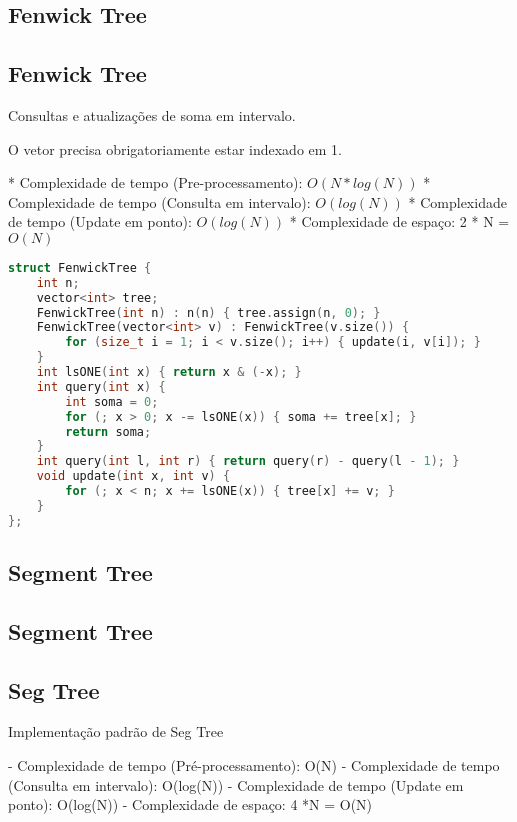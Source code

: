 \documentclass[11pt, a4paper, twoside]{article}
\begin{document}
\subsection{Fenwick Tree}


\subsection{Fenwick Tree}



Consultas e atualizações de soma em intervalo.

O vetor precisa obrigatoriamente estar indexado em 1.

* Complexidade de tempo (Pre-processamento): $O(N * log(N))$
* Complexidade de tempo (Consulta em intervalo): $O(log(N))$
* Complexidade de tempo (Update em ponto): $O(log(N))$
* Complexidade de espaço: 2 * N = $O(N)$

\begin{lstlisting}[language=C++]
struct FenwickTree {
    int n;
    vector<int> tree;
    FenwickTree(int n) : n(n) { tree.assign(n, 0); }
    FenwickTree(vector<int> v) : FenwickTree(v.size()) {
        for (size_t i = 1; i < v.size(); i++) { update(i, v[i]); }
    }
    int lsONE(int x) { return x & (-x); }
    int query(int x) {
        int soma = 0;
        for (; x > 0; x -= lsONE(x)) { soma += tree[x]; }
        return soma;
    }
    int query(int l, int r) { return query(r) - query(l - 1); }
    void update(int x, int v) {
        for (; x < n; x += lsONE(x)) { tree[x] += v; }
    }
};
\end{lstlisting}

\subsection{Segment Tree}

\subsection{Segment Tree}



\subsection{Seg Tree}

Implementação padrão de Seg Tree

- Complexidade de tempo (Pré-processamento): O(N)
- Complexidade de tempo (Consulta em intervalo): O(log(N))
- Complexidade de tempo (Update em ponto): O(log(N))
- Complexidade de espaço: 4 *N = O(N)
\end{document}
